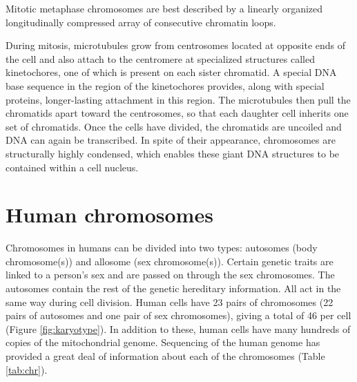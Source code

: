 Mitotic metaphase chromosomes are best described by a linearly organized longitudinally compressed array of consecutive chromatin loops.

During mitosis, microtubules grow from centrosomes located at opposite ends of the cell and also attach to the centromere at specialized structures called kinetochores, one of which is present on each sister chromatid. A special DNA base sequence in the region of the kinetochores provides, along with special proteins, longer-lasting attachment in this region. The microtubules then pull the chromatids apart toward the centrosomes, so that each daughter cell inherits one set of chromatids. Once the cells have divided, the chromatids are uncoiled and DNA can again be transcribed. In spite of their appearance, chromosomes are structurally highly condensed, which enables these giant DNA structures to be contained within a cell nucleus.

\hypertarget{human-chromosomes}{%
\section{Human chromosomes}\label{human-chromosomes}}

Chromosomes in humans can be divided into two types: autosomes (body chromosome(s)) and allosome (sex chromosome(s)). Certain genetic traits are linked to a person's sex and are passed on through the sex chromosomes. The autosomes contain the rest of the genetic hereditary information. All act in the same way during cell division. Human cells have 23 pairs of chromosomes (22 pairs of autosomes and one pair of sex chromosomes), giving a total of 46 per cell (Figure \ref{fig:karyotype}). In addition to these, human cells have many hundreds of copies of the mitochondrial genome. Sequencing of the human genome has provided a great deal of information about each of the chromosomes (Table \ref{tab:chr}).


